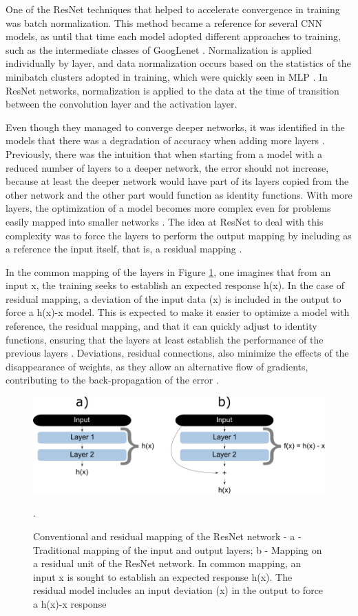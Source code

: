 One of the ResNet techniques that helped to accelerate convergence in training was batch normalization. This method became a reference for several CNN models, as until that time each model adopted different approaches to training, such as the intermediate classes of GoogLenet \cite{johnson2019}. Normalization is applied individually by layer, and data normalization occurs based on the statistics of the minibatch clusters adopted in training, which were quickly seen in MLP \cite{zhang2020dive}. In ResNet networks, normalization is applied to the data at the time of transition between the convolution layer and the activation layer.

Even though they managed to converge deeper networks, it was identified in the models that there was a degradation of accuracy when adding more layers \cite{he2016}. Previously, there was the intuition that when starting from a model with a reduced number of layers to a deeper network, the error should not increase, because at least the deeper network would have part of its layers copied from the other network and the other part would function as identity functions. With more layers, the optimization of a model becomes more complex even for problems easily mapped into smaller networks \cite{he2016}. The idea at ResNet to deal with this complexity was to force the layers to perform the output mapping by including as a reference the input itself, that is, a residual mapping \cite{geron2019}.

In the common mapping of the layers in Figure \ref{fig:figure136}, one imagines that from an input x, the training seeks to establish an expected response h(x). In the case of residual mapping, a deviation of the input data (x) is included in the output to force a h(x)-x model. This is expected to make it easier to optimize a model with reference, the residual mapping, and that it can quickly adjust to identity functions, ensuring that the layers at least establish the performance of the previous layers \cite{zhang2020dive}. Deviations, residual connections, also minimize the effects of the disappearance of weights, as they allow an alternative flow of gradients, contributing to the back-propagation of the error \cite{elgendy2020}.

\begin{figure}
    \centering
    \includegraphics[scale=0.4]{images/figure136.png}
    \caption{Conventional and residual mapping of the ResNet network - a - Traditional mapping of the input and output layers; b - Mapping on a residual unit of the ResNet network. In common mapping, an input x is sought to establish an expected response h(x). The residual model includes an input deviation (x) in the output to force a h(x)-x response \cite{geron2019}}.
    \label{fig:figure136}
\end{figure}

